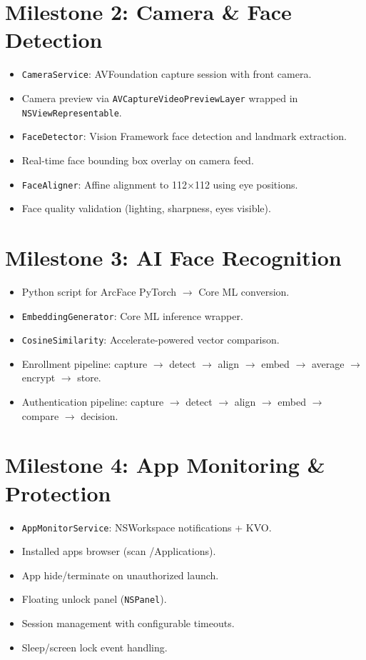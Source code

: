 \documentclass[12pt,a4paper]{report}
\begin{document}
\section{Milestone 2: Camera \& Face Detection}
\begin{itemize}[noitemsep]
    \item \texttt{CameraService}: AVFoundation capture session with front camera.
    \item Camera preview via \texttt{AVCaptureVideoPreviewLayer} wrapped in \texttt{NSViewRepresentable}.
    \item \texttt{FaceDetector}: Vision Framework face detection and landmark extraction.
    \item Real-time face bounding box overlay on camera feed.
    \item \texttt{FaceAligner}: Affine alignment to 112$\times$112 using eye positions.
    \item Face quality validation (lighting, sharpness, eyes visible).
\end{itemize}

\section{Milestone 3: AI Face Recognition}
\begin{itemize}[noitemsep]
    \item Python script for ArcFace PyTorch $\to$ Core ML conversion.
    \item \texttt{EmbeddingGenerator}: Core ML inference wrapper.
    \item \texttt{CosineSimilarity}: Accelerate-powered vector comparison.
    \item Enrollment pipeline: capture $\to$ detect $\to$ align $\to$ embed $\to$ average $\to$ encrypt $\to$ store.
    \item Authentication pipeline: capture $\to$ detect $\to$ align $\to$ embed $\to$ compare $\to$ decision.
\end{itemize}

\section{Milestone 4: App Monitoring \& Protection}
\begin{itemize}[noitemsep]
    \item \texttt{AppMonitorService}: NSWorkspace notifications + KVO.
    \item Installed apps browser (scan /Applications).
    \item App hide/terminate on unauthorized launch.
    \item Floating unlock panel (\texttt{NSPanel}).
    \item Session management with configurable timeouts.
    \item Sleep/screen lock event handling.
\end{itemize}
\end{document}
